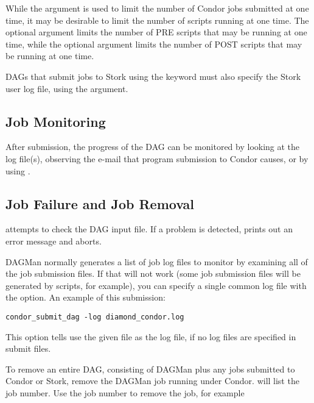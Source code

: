 While the  argument is used to limit the number
of Condor jobs submitted at one time,
it may be desirable to limit the number of scripts running
at one time.
The optional  argument limits the number of PRE
scripts that may be running at one time,
while the optional  argument limits the number of POST
scripts that may be running at one time.

DAGs that submit jobs to Stork using the  keyword must also
specify the Stork user log file, using the  argument.

\subsection{Job Monitoring}

After submission, the progress of the DAG can be monitored
by looking at the log file(s),
observing the e-mail that program submission to Condor causes,
or by using  .

\subsection{Job Failure and Job Removal}

 attempts to check the DAG input file.
If a problem is detected,
 prints out an error message and aborts.

DAGMan normally generates a list of job log files to
monitor by examining all of the job submission files.  If
that will not work (some job submission files will be generated
by  scripts, for example), you can specify a single
common log file with the  option.
An example of this submission:
\begin{verbatim}
condor_submit_dag -log diamond_condor.log
\end{verbatim}
This option tells  use the given file as
the log file, if no log files are specified in submit files.

To remove an entire DAG, consisting of DAGMan plus
any jobs submitted to Condor or Stork,
remove the DAGMan job running under Condor.
 will list the job number.
Use the job number to remove the job, for example

